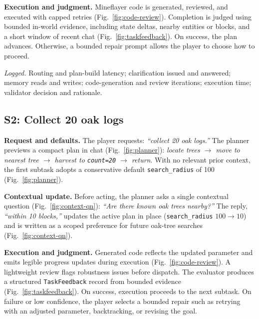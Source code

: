\noindent
\textbf{Execution and judgment.}
Mineflayer code is generated, reviewed, and executed with capped retries (Fig.~\ref{fig:code-review}). Completion is judged using bounded in-world evidence, including state deltas, nearby entities or blocks, and a short window of recent chat (Fig.~\ref{fig:taskfeedback}). On success, the plan advances. Otherwise, a bounded repair prompt allows the player to choose how to proceed.

\noindent\textit{Logged.}
Routing and plan-build latency; clarification issued and answered; memory reads and writes; code-generation and review iterations; execution time; validator decision and rationale.

\vspace{-2.5mm}
\subsection{S2: Collect 20 oak logs}

\noindent
\textbf{Request and defaults.}
The player requests:
\emph{“collect 20 oak logs.”}
The planner previews a compact plan in chat (Fig.~\ref{fig:planner}):
\emph{locate trees $\rightarrow$ move to nearest tree $\rightarrow$ harvest to \texttt{count=20} $\rightarrow$ return}.
With no relevant prior context, the first subtask adopts a conservative default \texttt{search\_radius} of 100 (Fig.~\ref{fig:planner}).

\noindent
\textbf{Contextual update.}
Before acting, the planner asks a single contextual question (Fig.~\ref{fig:context-qn}):
\emph{“Are there known oak trees nearby?”}
The reply,
\emph{“within 10 blocks,”}
updates the active plan in place (\texttt{search\_radius} \(100 \rightarrow 10\)) and is written as a scoped preference for future oak-tree searches (Fig.~\ref{fig:context-qn}).

\noindent
\textbf{Execution and judgment.}
Generated code reflects the updated parameter and emits legible progress updates during execution (Fig.~\ref{fig:code-review}). A lightweight review flags robustness issues before dispatch. The evaluator produces a structured \texttt{TaskFeedback} record from bounded evidence (Fig.~\ref{fig:taskfeedback}). On success, execution proceeds to the next subtask. On failure or low confidence, the player selects a bounded repair such as retrying with an adjusted parameter, backtracking, or revising the goal.

